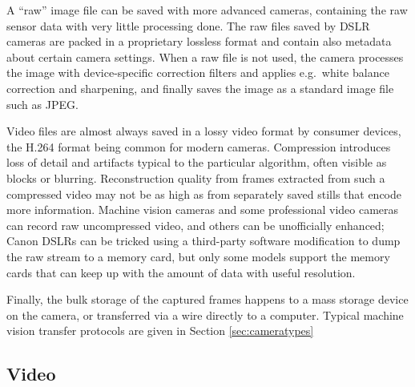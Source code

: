 
A ``raw'' image file can be saved with more advanced cameras, containing the raw sensor data with very little processing done.
The raw files saved by DSLR cameras are packed in a proprietary lossless format and contain also metadata about certain camera settings.
When a raw file is not used, the camera processes the image with device-specific correction filters and applies e.g.~white balance correction and sharpening, and finally saves the image as a standard image file such as JPEG.
\cite{szeliski10vision}


Video files are almost always saved in a lossy video format by consumer devices, the H.264 format being common for modern cameras.
Compression introduces loss of detail and artifacts typical to the particular algorithm, often visible as blocks or blurring.
\cite{richardson2004h264}
Reconstruction quality from frames extracted from such a compressed video may not be as high as from separately saved stills that encode more information.
Machine vision cameras and some professional video cameras can record raw uncompressed video, and others can be unofficially enhanced;
Canon DSLRs can be tricked using a third-party software modification \cite{magiclantern} to dump the raw stream to a memory card, but only some models support the memory cards that can keep up with the amount of data with useful resolution.

Finally, the bulk storage of the captured frames happens to a mass storage device on the camera, or transferred via a wire directly to a computer.
\cite{hornberg2007handbook,ni2013choosing}
Typical machine vision transfer protocols are given in Section \ref{sec:cameratypes}


\subsection{Video} \label{sec:video} %

